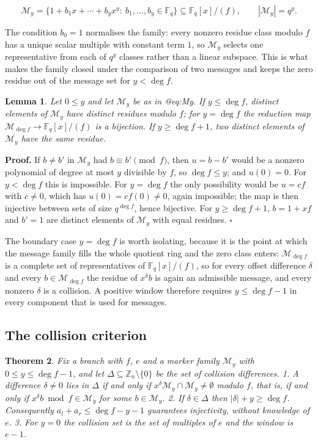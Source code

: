 \documentclass[11pt,reqno]{amsart}
\newtheorem{theorem}{Theorem}[section]
\newtheorem{lemma}[theorem]{Lemma}
\theoremstyle{definition}
\theoremstyle{remark}
\newcommand{\F}{\mathbb{F}}
\newcommand{\Z}{\mathbb{Z}}
\newcommand{\M}{\mathcal{M}}
\begin{document}
\begin{equation}\label{eq:My}
\M_y=\{1+b_1x+\cdots+b_yx^y:\ b_1,\dots,b_y\in\F_q\}\subseteq\F_q[x]/(f),\qquad |\M_y|=q^y.
\end{equation}

The condition $b_0=1$ normalises the family: every nonzero residue class modulo $f$ has a unique scalar multiple with constant term $1$, so $\M_y$ selects one representative from each of $q^y$ classes rather than a linear subspace. This is what makes the family closed under the comparison of two messages and keeps the zero residue out of the message set for $y<\deg f$.


\begin{lemma}\label{marker}
Let $0\le y$ and let $\M_y$ be as in @eq:My. If $y\le\deg f$, distinct elements of $\M_y$ have distinct residues modulo $f$; for $y=\deg f$ the reduction map $\M_{\deg f}\to\F_q[x]/(f)$ is a bijection. If $y\ge\deg f+1$, two distinct elements of $\M_y$ have the same residue.
\end{lemma}

\textbf{Proof.} If $b\neq b'$ in $\M_y$ had $b\equiv b'\pmod f$, then $u=b-b'$ would be a nonzero polynomial of degree at most $y$ divisible by $f$, so $\deg f\le y$; and $u(0)=0$. For $y<\deg f$ this is impossible. For $y=\deg f$ the only possibility would be $u=c f$ with $c\neq0$, which has $u(0)=c f(0)\neq0$, again impossible; the map is then injective between sets of size $q^{\deg f}$, hence bijective. For $y\ge\deg f+1$, $b=1+x f$ and $b'=1$ are distinct elements of $\M_y$ with equal residues. $\square$


The boundary case $y=\deg f$ is worth isolating, because it is the point at which the message family fills the whole quotient ring and the zero class enters: $\M_{\deg f}$ is a complete set of representatives of $\F_q[x]/(f)$, so for every offset difference $\delta$ and every $b\in\M_{\deg f}$ the residue of $x^\delta b$ is again an admissible message, and every nonzero $\delta$ is a collision. A positive window therefore requires $y\le\deg f-1$ in every component that is used for messages.


\subsection{The collision criterion}

\begin{theorem}\label{hybrid}
Fix a branch with $f$, $e$ and a marker family $\M_y$ with $0\le y\le\deg f-1$, and let $\Delta\subseteq\Z_n\setminus\{0\}$ be the set of collision differences. 1. A difference $\delta\neq0$ lies in $\Delta$ if and only if $x^\delta\M_y\cap\M_y\neq\emptyset$ modulo $f$, that is, if and only if $x^\delta b\bmod f\in\M_y$ for some $b\in\M_y$. 2. If $\delta\in\Delta$ then $|\delta|+y\ge\deg f$. Consequently $a_l+a_r\le\deg f-y-1$ guarantees injectivity, without knowledge of $e$. 3. For $y=0$ the collision set is the set of multiples of $e$ and the window is $e-1$.
\end{theorem}
\end{document}
